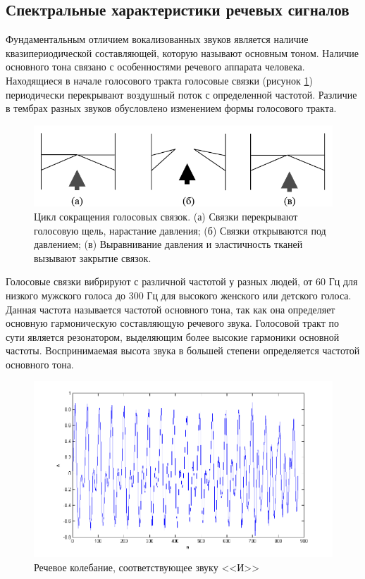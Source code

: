 \documentclass[a4paper,14pt,russian,utf8,nocolumnsxix,nocolumnxxxi,nocolumnxxxii]{eskdtext}
\begin{document}
\subsection{Спектральные характеристики речевых сигналов}
Фундаментальным отличием вокализованных звуков является наличие квазипериодической составляющей, которую называют основным тоном. Наличие основного тона связано с особенностями речевого аппарата человека. Находящиеся в начале голосового тракта голосовые связки (рисунок \ref{larynx}) периодически перекрывают воздушный поток с определенной частотой. Различие в тембрах разных звуков обусловлено изменением формы голосового тракта.\cite{rabiner_eng}
\begin{figure}[H]	
	\centering
	\includegraphics[width=120mm]{larynx.png}			
	\caption{Цикл сокращения голосовых связок. (а) Связки перекрывают голосовую щель, нарастание давления; (б) Связки открываются под давлением; (в) Выравнивание давления и эластичность тканей вызывают закрытие связок.}
	\label{larynx}
\end{figure}

Голосовые связки вибрируют с различной частотой у разных людей, от 60 Гц для низкого мужского голоса до 300 Гц для высокого женского или детского голоса. Данная частота называется частотой основного тона, так как она определяет основную гармоническую составляющую речевого звука. Голосовой тракт по сути является резонатором, выделяющим более высокие гармоники основной частоты. Воспринимаемая высота звука в большей степени определяется частотой основного тона.

\begin{figure}[H]	
	\centering
	\includegraphics[width=120mm]{i1_form.png}			
	\caption{Речевое колебание, соответствующее звуку <<И>>}
	\label{i1_form}
\end{figure}
\end{document}
